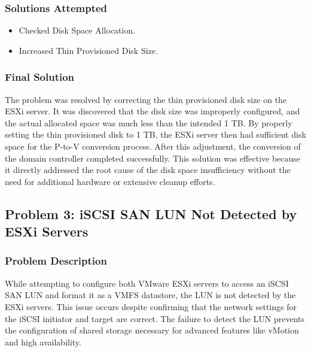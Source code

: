 \documentclass[letterpaper]{article}
\begin{document}
\subsubsection{Solutions Attempted}
\label{sec:org7b15470}
\begin{itemize}
\item Checked Disk Space Allocation.
\item Increased Thin Provisioned Disk Size.
\end{itemize}

\subsubsection{Final Solution}
\label{sec:orgaf9200f}
The problem was resolved by correcting the thin provisioned disk size on the ESXi server. It was discovered that the disk size was improperly configured, and the actual allocated space was much less than the intended 1 TB. By properly setting the thin provisioned disk to 1 TB, the ESXi server then had sufficient disk space for the P-to-V conversion process. After this adjustment, the conversion of the domain controller completed successfully. This solution was effective because it directly addressed the root cause of the disk space insufficiency without the need for additional hardware or extensive cleanup efforts.

\subsection{Problem 3: iSCSI SAN LUN Not Detected by ESXi Servers}
\label{sec:org7cdc638}
\subsubsection{Problem Description}
\label{sec:org2766ea3}
While attempting to configure both VMware ESXi servers to access an iSCSI SAN LUN and format it as a VMFS datastore, the LUN is not detected by the ESXi servers. This issue occurs despite confirming that the network settings for the iSCSI initiator and target are correct. The failure to detect the LUN prevents the configuration of shared storage necessary for advanced features like vMotion and high availability.
\end{document}
